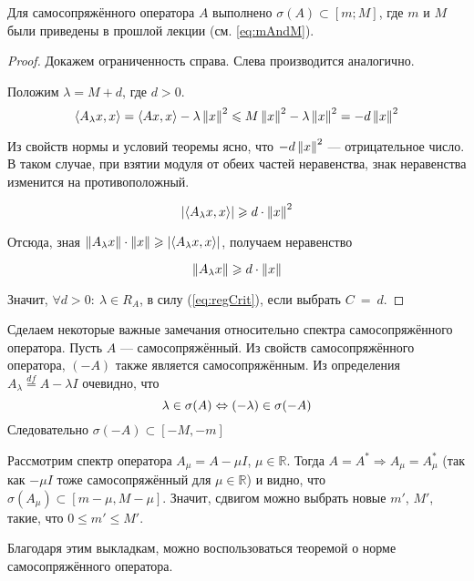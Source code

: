 \documentclass[12pt]{article}
\begin{document}
	\begin{theorem}
		Для самосопряжённого оператора $A$ выполнено $\sigma(A) \subset [m;M]$, где $m$ и $M$ были приведены в 
		прошлой лекции (см. \ref{eq:mAndM}).
	\end{theorem}
	\begin{proof}
		Докажем ограниченность справа. Слева производится аналогично.	
	
		Положим $\lambda = M + d$, где $d > 0$.
		$$\left\langle A_{\lambda}x, x \right\rangle = \left\langle Ax, x \right\rangle - \lambda\left\| x \right\|^2 \leqslant M \left\| x \right\|^2 - \lambda\left\| x \right\|^2 = -d\left\| x \right\|^2$$
		
		Из свойств нормы и условий теоремы ясно, что $-d\left\| x \right\|^2$ --- отрицательное число. В таком случае, при взятии модуля
		от обеих частей неравенства, знак неравенства изменится на противоположный.

		$$\left| \left\langle A_{\lambda}x, x \right\rangle \right| \geqslant d\cdot\left\| x \right\|^2$$
		
		Отсюда, зная $\left\| A_{\lambda}x \right\|\cdot\left\| x \right\| \geqslant \left| \left\langle A_{\lambda}x, x \right\rangle \right|$, получаем неравенство
		
		$$\left\| A_{\lambda}x \right\| \geqslant d\cdot\left\| x \right\|$$
		
		Значит, $\forall d > 0:\: \lambda \in R_A$, в силу (\ref{eq:regCrit}), если выбрать $C~=~d$.
	\end{proof}
	
	Сделаем некоторые важные замечания относительно спектра самосопряжённого оператора. Пусть $A$ --- самосопряжённый. Из свойств
	самосопряжённого оператора, $(-A)$ также является самосопряжённым. Из определения $A_{\lambda} \overset{df}{=} A - \lambda I$ 
	очевидно, что
	$$\lambda \in \sigma(A) \Leftrightarrow (-\lambda) \in \sigma(-A)$$
	Следовательно $\sigma(-A) \subset [-M, -m]$
	
	Рассмотрим спектр оператора $A_{\mu} = A - \mu I$, $\mu \in \mathbb{R}$. Тогда $A = A^* \Rightarrow A_{\mu} = A_{\mu}^*$ 
	(так как $-\mu I$ тоже самосопряжённый для $\mu\in\mathbb{R}$) и видно, что $\sigma(A_{\mu}) \subset[m-\mu,M-\mu]$. Значит,
	сдвигом можно выбрать новые $m'$, $M'$, такие, что $0\leq m' \leq M'$.
	
	Благодаря этим выкладкам, можно воспользоваться теоремой о норме самосопряжённого оператора.
	
\end{document}
